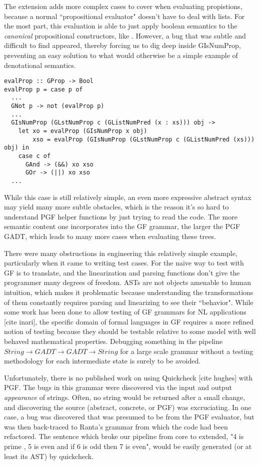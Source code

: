 The extension adds more complex cases  to cover when
evaluating propistions, because a normal ``propositional evaluator" doesn't have to
deal with lists. For the most part, this evaluation is able to just apply
boolean semantics to the \emph{canonical} propositional constructors, like . However, a
bug that was subtle and difficult to find appeared, thereby forcing us to dig
deep inside GIsNumProp, preventing an easy solution to what would otherwise be a
simple example of denotational semantics.
\begin{verbatim}
evalProp :: GProp -> Bool
evalProp p = case p of
  ...
  GNot p -> not (evalProp p)
  ...
  GIsNumProp (GLstNumProp c (GListNumPred (x : xs))) obj ->
    let xo = evalProp (GIsNumProp x obj)
        xso = evalProp (GIsNumProp (GLstNumProp c (GListNumPred (xs))) obj) in
    case c of
      GAnd -> (&&) xo xso
      GOr -> (||) xo xso
  ...
\end{verbatim}
While this case is still relatively simple, an even more expressive abstract syntax
may yield many more subtle obstacles, which is the reason it's so hard
to understand PGF helper functions by just trying to read the code. The more semantic content one
incorporates into the GF grammar, the larger the PGF GADT, which leads to many
more cases when evaluating these trees.

There were many obstructions in engineering this relatively simple
example, particularly when it came to writing test cases. For the naive
way to test with GF is to translate, and the linearization and parsing functions
don't give the programmer many degrees of freedom. ASTs are not objects amenable
to human intuition, which makes it problematic because understanding the
transformations of them constantly requires parsing and linearizing to see their
``behavior". While some work has been done to allow testing
of GF grammars for NL applications [cite inari], the specific domain of formal languages in
GF requires a more refined notion of testing because they should be testable
relative to some model with well behaved mathematical properties. Debugging
something in the pipeline $String \rightarrow GADT \rightarrow GADT \rightarrow
String$ for a large scale grammar without a testing methodology for each
intermediate state is surely to be avoided.

Unfortunately, there is no published work on using Quickcheck [cite hughes] with
PGF. The bugs in this grammar were discovered via the input and output
\emph{appearance} of strings. Often, no string would be returned after a small
change, and discovering the source (abstract, concrete, or PGF) was
excruciating. In one case, a bug was discovered that was presumed to be from the
PGF evaluator, but was then back-traced to Ranta's grammar from which the code
had been refactored. The sentence which broke our pipeline from core to
extended, "4 is prime , 5 is even and if 6 is odd then 7 is even", would be
easily generated (or at least its AST) by quickcheck.

